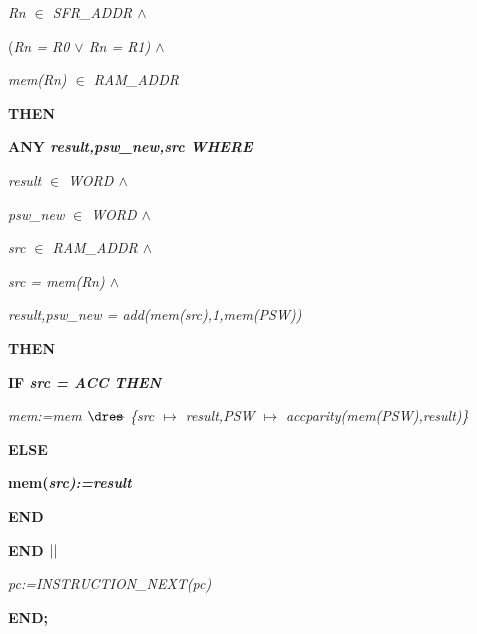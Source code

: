 \begin{sloppypar}
\hspace*{0.20in}\it Rn $\in$  \it SFR\_ADDR  $\land$ 

\hspace*{0.20in}\rm (\it Rn \rm = \it R0  $\lor$  \it Rn \rm = \it R1\rm )  $\land$ 

\hspace*{0.20in}\it mem\rm (\it Rn\rm ) $\in$  \it RAM\_ADDR

\hspace*{0.10in}\bf THEN

\hspace*{0.20in}\bf ANY \it result\rm ,\it psw\_new\rm ,\it src \bf WHERE

\hspace*{0.30in}\it result $\in$  \it WORD  $\land$ 

\hspace*{0.30in}\it psw\_new $\in$  \it WORD  $\land$ 

\hspace*{0.30in}\it src $\in$  \it RAM\_ADDR  $\land$ 

\hspace*{0.30in}\it src \rm = \it mem\rm (\it Rn\rm )  $\land$ 

\hspace*{0.30in}\it result\rm ,\it psw\_new \rm = \it add\rm (\it mem\rm (\it src\rm )\rm ,\rm 1\rm ,\it mem\rm (\it PSW\rm )\rm )

\hspace*{0.20in}\bf THEN

\hspace*{0.30in}\bf IF \it src \rm = \it ACC \bf THEN

\hspace*{0.40in}\it mem\rm :=\it mem $\lover$ \rm \{\it src $\mapsto$ \it result\rm ,\it PSW $\mapsto$ \it accparity\rm (\it mem\rm (\it PSW\rm )\rm ,\it result\rm )\rm \}

\hspace*{0.30in}\bf ELSE

\hspace*{0.40in}\bf mem\rm (\it src\rm )\rm :=\it result

\hspace*{0.30in}\bf END

\hspace*{0.20in}\bf END  $\mbox{$\mid\mid$}$ 

\hspace*{0.20in}\it pc\rm :=\it INSTRUCTION\_NEXT\rm (\it pc\rm )

\hspace*{0.10in}\bf END\rm ;


\end{sloppypar}
